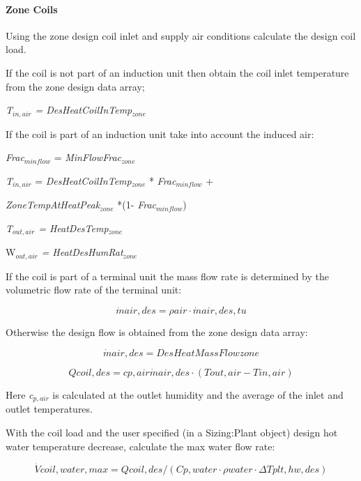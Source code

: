 \paragraph{Zone Coils}\label{zone-coils}

Using the zone design coil inlet and supply air conditions calculate the design coil load.

If the coil is not part of an induction unit then obtain the coil inlet temperature from the zone design data array;

\emph{T\(_{in,air}\) = DesHeatCoilInTemp\(_{zone}\)}

If the coil is part of an induction unit take into account the induced air:

\emph{Frac\(_{minflow}\)} = \emph{MinFlowFrac\(_{zone}\)}

\emph{T\(_{in,air}\)} = \emph{DesHeatCoilInTemp\(_{zone}\)} * \emph{Frac\(_{minflow}\)} +

\emph{ZoneTempAtHeatPeak\(_{zone}\)} *(1- \emph{Frac\(_{minflow}\)})

\emph{T\(_{out,air}\) = HeatDesTemp\(_{zone}\)}

W\emph{\(_{out,air}\) = HeatDesHumRat\(_{zone}\)}

If the coil is part of a terminal unit the mass flow rate is determined by the volumetric flow rate of the terminal unit:

\begin{equation}
\dot mair,des = \rho air\cdot \dot mair,des,tu
\end{equation}

Otherwise the design flow is obtained from the zone design data array:

\begin{equation}
\dot mair,des = DesHeatMassFlowzone
\end{equation}

\begin{equation}
Qcoil,des = cp,air\dot mair,des\cdot (Tout,air - Tin,air)
\end{equation}

Here \emph{c\(_{p,air}\)} is calculated at the outlet humidity and the average of the inlet and outlet temperatures.

With the coil load and the user specified (in a Sizing:Plant object) design hot water temperature decrease, calculate the max water flow rate:

\begin{equation}
\dot Vcoil,water,max = Qcoil,des/(Cp,water\cdot \rho water\cdot \Delta Tplt,hw,des)
\end{equation}

